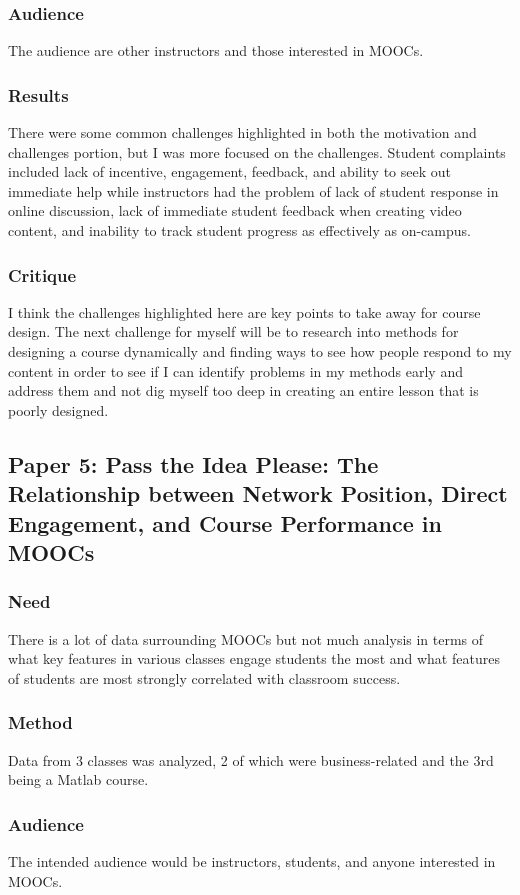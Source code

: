 \documentclass[
	letterpaper, %
]{jdf}
\begin{document}
\subsubsection{Audience}
The audience are other instructors and those interested in MOOCs.
\subsubsection{Results}
There were some common challenges highlighted in both the motivation and challenges portion, but I was more focused on the challenges. Student complaints included lack of incentive, engagement, feedback, and ability to seek out immediate help while instructors had the problem of lack of student response in online discussion, lack of immediate student feedback when creating video content, and inability to track student progress as effectively as on-campus.
\subsubsection{Critique}
I think the challenges highlighted here are key points to take away for course design. The next challenge for myself will be to research into methods for designing a course dynamically and finding ways to see how people respond to my content in order to see if I can identify problems in my methods early and address them and not dig myself too deep in creating an entire lesson that is poorly designed.

\subsection{Paper 5: Pass the Idea Please: The Relationship between Network Position, Direct Engagement, and Course Performance in MOOCs \citep{houston1}}
\subsubsection{Need}
There is a lot of data surrounding MOOCs but not much analysis in terms of what key features in various classes engage students the most and what features of students are most strongly correlated with classroom success.
\subsubsection{Method}
Data from 3 classes was analyzed, 2 of which were business-related and the 3rd being a Matlab course.
\subsubsection{Audience}
The intended audience would be instructors, students, and anyone interested in MOOCs.
\end{document}
